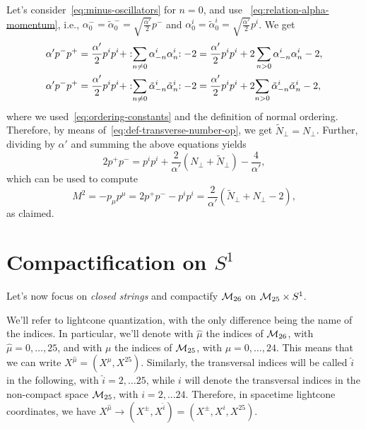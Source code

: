 \begin{mdframed}
\begin{innerproof}
    Let's consider~\eqref{eq:minus-oscillators} for $n=0$, and use ~\eqref{eq:relation-alpha-momentum}, i.e., $\alpha^-_0 = \tilde{\alpha}^-_0 = \sqrt{\frac{\alpha'}{2}} p^-$ and $\alpha^i_0 = \tilde{\alpha}^i_0 = \sqrt{\frac{\alpha'}{2}}p^i$. We get
    \begin{equation}
    \begin{aligned}
        \alpha' p^- p^+ &= \frac{\alpha'}{2} p^i p^i + :\mathrel{\sum_{n\neq0} \alpha^i_{-n} \alpha^i_n}: - 2 = \frac{\alpha'}{2} p^i p^i + 2 \sum_{n>0} \alpha^i_{-n} \alpha^i_n - 2, \\
        \alpha' p^- p^+ &= \frac{\alpha'}{2} p^i p^i + :\mathrel{\sum_{n\neq0} \tilde{\alpha}^i_{-n} \tilde{\alpha}^i_n}: - 2 = \frac{\alpha'}{2} p^i p^i + 2{\sum_{n>0} \tilde{\alpha}^i_{-n} \tilde{\alpha}^i_n} - 2 ,\\
    \end{aligned}
    \end{equation}
    where we used~\eqref{eq:ordering-constants} and the definition of normal ordering. Therefore, by means of~\eqref{eq:def-transverse-number-op}, we get $\tilde{N}_\perp = N_\perp$. Further, dividing by $\alpha'$ and summing the above equations yields
    \begin{equation}
        2 p^+ p^- = p^i p^i + \frac{2}{\alpha'} (N_\perp + \tilde{N}_\perp) - \frac{4}{\alpha'},
    \end{equation}
    which can be used to compute
    \begin{equation}
        M^2 = - p_\mu p^\mu = 2p^+ p^- - p^i p^i = \frac{2}{\alpha'} (\tilde{N}_\perp + N_\perp - 2),
    \end{equation}
    as claimed.
\end{innerproof}
\end{mdframed}

\section{Compactification on \texorpdfstring{$S^1$}{S1}}
Let's now focus on \emph{closed strings} and compactify $\mathcal{M}_{26}$ on $\mathcal{M}_{25} \times S^1$.

We'll refer to lightcone quantization, with the only difference being the name of the indices. In particular, we'll denote with $\hat{\mu}$ the indices of $\mathcal{M}_{26}$, with $\hat{\mu} = 0, \dots, 25$, and with $\mu$ the indices of $\mathcal{M}_{25}$, with $\mu = 0, \dots , 24$. This means that we can write $X^{\hat{\mu}} = (X^\mu, X^{25})$. Similarly, the transversal indices will be called $\hat{i}$ in the following, with $\hat{i} = 2, \dots 25$, while $i$ will denote the transversal indices in the non-compact space $\mathcal{M}_{25}$, with $i = 2, \dots 24$. Therefore, in spacetime lightcone coordinates, we have $X^{\hat{\mu}} \to (X^\pm, X^{\hat{i}}) = (X^\pm, X^i, X^{25})$.

